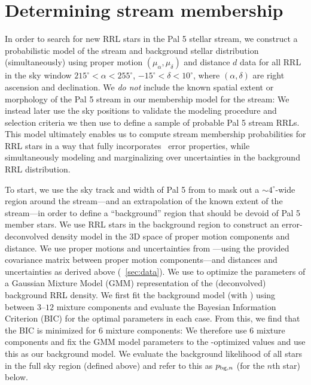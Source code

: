 \documentclass[twocolumn]{aastex63}
\begin{document}

\section{Determining stream membership} \label{sec:membership}

In order to search for new RRL stars in the Pal 5 stellar stream, we construct a probabilistic model of the stream and background stellar distribution (simultaneously) using proper motion $(\mu_\alpha, \mu_\delta)$ and distance $d$ data for all RRL in the sky window $215^\circ < \alpha < 255^\circ$, $-15^\circ < \delta < 10^\circ$, where $(\alpha, \delta)$ are right ascension and declination.
We \emph{do not} include the known spatial extent or morphology of the Pal 5 stream in our membership model for the stream: We instead later use the sky positions to validate the modeling procedure and selection criteria we then use to define a sample of probable Pal 5 stream RRLs.
This model ultimately enables us to compute stream membership probabilities for RRL stars in a way that fully incorporates \Gaia\ error properties, while simultaneously modeling and marginalizing over uncertainties in the background RRL distribution.

To start, we use the sky track and width of Pal 5 from \citet{Bonaca:2019} to mask out a $\sim4^\circ$-wide region around the stream---and an extrapolation of the known extent of the stream---in order to define a ``background'' region that should be devoid of Pal 5 member stars.
We use RRL stars in the background region to construct an error-deconvolved density model in the 3D space of proper motion components and distance.
We use proper motions and uncertainties from \Gaia---using the provided covariance matrix between proper motion components---and distances and uncertainties as derived above (\sectionname~\ref{sec:data}).
We use  \citep[;][]{Bovy:XD} to optimize the parameters of a Gaussian Mixture Model (GMM) representation of the (deconvolved) background RRL density.
We first fit the background model (with ) using between $3$--$12$ mixture components and evaluate the Bayesian Information Criterion (BIC) for the optimal parameters in each case.
From this, we find that the BIC is minimized for 6 mixture components: We therefore use 6 mixture components and fix the GMM model parameters to the -optimized values and use this as our background model.
We evaluate the background likelihood of all stars in the full sky region (defined above) and refer to this as $p_{{\rm bg}, n}$ (for the $n$th star) below.
\end{document}
